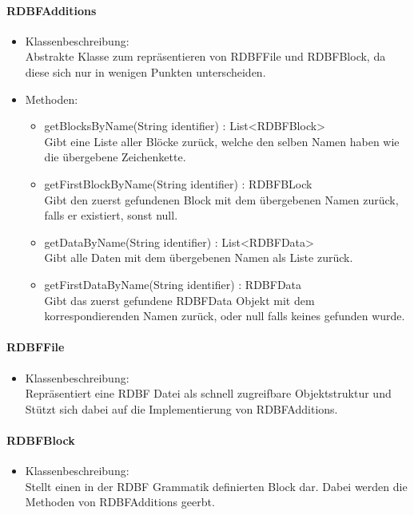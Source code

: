 \documentclass[parskip=full]{scrartcl}
\begin{document}
\paragraph{RDBFAdditions}
\begin{itemize}
\item Klassenbeschreibung: \\
Abstrakte Klasse zum repräsentieren von RDBFFile und RDBFBlock, da diese sich nur in wenigen Punkten unterscheiden.
\item Methoden: \\
\begin{itemize}
\item getBlocksByName(String identifier) : List<RDBFBlock> \\
Gibt eine Liste aller Blöcke zurück, welche den selben Namen haben wie die übergebene Zeichenkette.
\item getFirstBlockByName(String identifier) : RDBFBLock \\
Gibt den zuerst gefundenen Block mit dem übergebenen Namen zurück, falls er existiert, sonst null.
\item getDataByName(String identifier) : List<RDBFData> \\
Gibt alle Daten mit dem übergebenen Namen als Liste zurück.
\item getFirstDataByName(String identifier) : RDBFData \\
Gibt das zuerst gefundene RDBFData Objekt mit dem korrespondierenden Namen zurück, oder null falls keines gefunden wurde.
\end{itemize}
\end{itemize}

\paragraph{RDBFFile}
\begin{itemize}
\item Klassenbeschreibung: \\
Repräsentiert eine RDBF Datei als schnell zugreifbare Objektstruktur und Stützt sich dabei auf die Implementierung von RDBFAdditions.
\end{itemize}

\paragraph{RDBFBlock}
\begin{itemize}
\item Klassenbeschreibung: \\
Stellt einen in der RDBF Grammatik definierten Block dar. Dabei werden die Methoden von RDBFAdditions geerbt.
\end{itemize}
\end{document}
